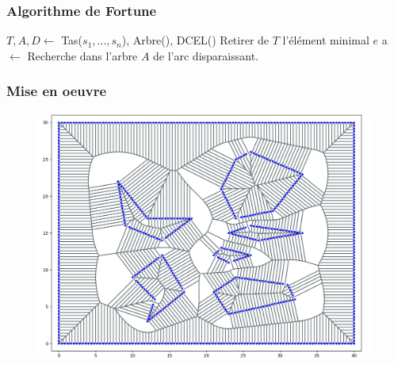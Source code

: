 \begin{frame}
\frametitle{Algorithme de Fortune}
    \small
    
    \vspace{2pt}
    \begin{algorithmic}
        \State \(T, A, D \gets\) Tas(\(s_1, ..., s_n\)), Arbre(), DCEL()
            \State Retirer de \(T\) l'élément minimal \(e\)
                \State {}
            \Else
                \State a \(\gets \) Recherche dans l'arbre \(A\) de l'arc disparaissant.
                \State {}
            \EndIf
        \EndWhile
    \normalsize
    \end{algorithmic}
\end{frame}

\begin{frame}
\frametitle{Mise en oeuvre}
    \begin{figure}
        \centering
        \includegraphics[width=0.8\linewidth]{assets/Voronoi_build.png}
    \end{figure}
\end{frame}

